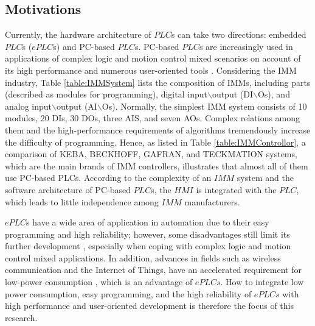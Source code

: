 \documentclass[journal,UTF8]{IEEEtran}
\begin{document}
	\subsection{Motivations}
	Currently, the hardware architecture of $PLC$s can take two directions: embedded $PLC$s ($ePLC$s) and PC-based $PLC$s. PC-based $PLC$s are increasingly used in applications of complex logic and motion control mixed scenarios on account of its high performance and numerous user-oriented tools \cite{Hossain2014Advanced}. Considering the IMM industry, Table \ref{table:IMMSystem} lists the composition of IMMs, including parts (described as modules for programming), digital input$\backslash$output (DI$\backslash$Os), and analog input$\backslash$output (AI$\backslash$Os). Normally, the simplest IMM system consists of 10 modules, 20 DIs, 30 DOs, three AIS, and seven AOs. Complex relations among them and the high-performance requirements of algorithms tremendously increase the difficulty of programming. Hence, as listed in Table \ref{table:IMMControllor}, a comparison of KEBA, BECKHOFF, GAFRAN, and TECKMATION systems, which are the main brands of IMM controllers, illustrates that almost all of them use PC-based PLCs. According to the complexity of an $IMM$ system and the software architecture of PC-based $PLC$s, the $HMI$ is integrated with the $PLC$, which leads to little independence among $IMM$ manufacturers. 
	
	$ePLC$s have a wide area of application in automation due to their easy programming and high reliability; however, some disadvantages still limit its further development \cite{Hossain2014Advanced}, especially when coping with complex logic and motion control mixed applications. In addition, advances in fields such as wireless communication and the Internet of Things, have an accelerated requirement for low-power consumption \cite{Arshad2017Green}, which is an advantage of $ePLCs$. How to integrate low power consumption, easy programming, and the high reliability of $ePLCs$ with high performance and user-oriented development is therefore the focus of this research.
	
\end{document}
